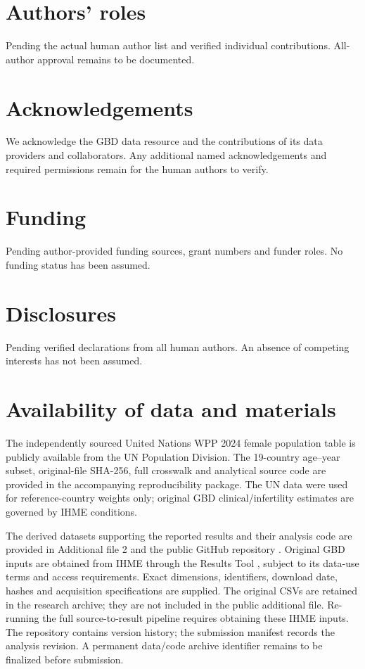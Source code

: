 \documentclass[11pt,a4paper]{article}
\begin{document}
\section*{Authors' roles}
Pending the actual human author list and verified individual contributions. All-author approval remains to be documented.

\section*{Acknowledgements}
We acknowledge the GBD data resource and the contributions of its data providers and collaborators. Any additional named acknowledgements and required permissions remain for the human authors to verify.


\section*{Funding}
Pending author-provided funding sources, grant numbers and funder roles. No funding status has been assumed.

\section*{Disclosures}
Pending verified declarations from all human authors. An absence of competing interests has not been assumed.

\section*{Availability of data and materials}
The independently sourced United Nations WPP 2024 female population table is publicly available from the UN Population Division. The 19-country age--year subset, original-file SHA-256, full crosswalk and analytical source code are provided in the accompanying reproducibility package. The UN data were used for reference-country weights only; original GBD clinical/infertility estimates are governed by IHME conditions.

The derived datasets supporting the reported results and their analysis code are provided in Additional file 2 and the public GitHub repository \cite{repository}. Original GBD inputs are obtained from IHME through the Results Tool \cite{results}, subject to its data-use terms and access requirements. Exact dimensions, identifiers, download date, hashes and acquisition specifications are supplied. The original CSVs are retained in the research archive; they are not included in the public additional file. Re-running the full source-to-result pipeline requires obtaining these IHME inputs. The repository contains version history; the submission manifest records the analysis revision. A permanent data/code archive identifier remains to be finalized before submission.
\end{document}
